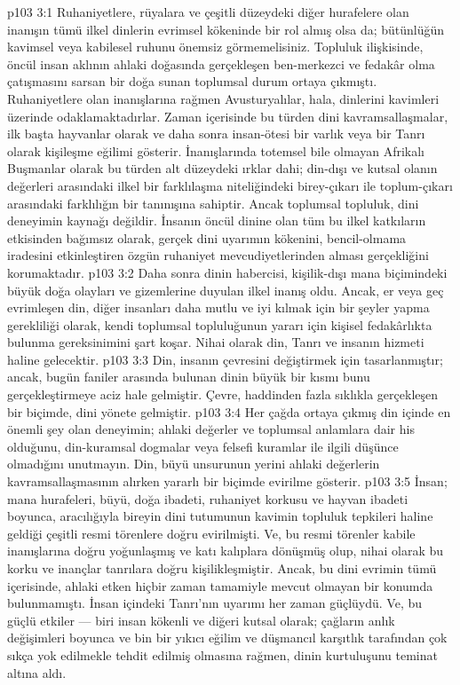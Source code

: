 \vs p103 3:1 Ruhaniyetlere, rüyalara ve çeşitli düzeydeki diğer hurafelere olan inanışın tümü ilkel dinlerin evrimsel kökeninde bir rol almış olsa da; bütünlüğün kavimsel veya kabilesel ruhunu önemsiz görmemelisiniz. Topluluk ilişkisinde, öncül insan aklının ahlaki doğasında gerçekleşen ben\hyp{}merkezci ve fedakâr olma çatışmasını sarsan bir doğa sunan toplumsal durum ortaya çıkmıştı. Ruhaniyetlere olan inanışlarına rağmen Avusturyalılar, hala, dinlerini kavimleri üzerinde odaklamaktadırlar. Zaman içerisinde bu türden dini kavramsallaşmalar, ilk başta hayvanlar olarak ve daha sonra insan\hyp{}ötesi bir varlık veya bir Tanrı olarak kişileşme eğilimi gösterir. İnanışlarında totemsel bile olmayan Afrikalı Buşmanlar olarak bu türden alt düzeydeki ırklar dahi; din\hyp{}dışı ve kutsal olanın değerleri arasındaki ilkel bir farklılaşma niteliğindeki birey\hyp{}çıkarı ile toplum\hyp{}çıkarı arasındaki farklılığın bir tanınışına sahiptir. Ancak toplumsal topluluk, dini deneyimin kaynağı değildir. İnsanın öncül dinine olan tüm bu ilkel katkıların etkisinden bağımsız olarak, gerçek dini uyarımın kökenini, bencil\hyp{}olmama iradesini etkinleştiren özgün ruhaniyet mevcudiyetlerinden alması gerçekliğini korumaktadır.
\vs p103 3:2 Daha sonra dinin habercisi, kişilik\hyp{}dışı mana biçimindeki büyük doğa olayları ve gizemlerine duyulan ilkel inanış oldu. Ancak, er veya geç evrimleşen din, diğer insanları daha mutlu ve iyi kılmak için bir şeyler yapma gerekliliği olarak, kendi toplumsal topluluğunun yararı için kişisel fedakârlıkta bulunma gereksinimini şart koşar. Nihai olarak din, Tanrı ve insanın hizmeti haline gelecektir.
\vs p103 3:3 Din, insanın çevresini değiştirmek için tasarlanmıştır; ancak, bugün faniler arasında bulunan dinin büyük bir kısmı bunu gerçekleştirmeye aciz hale gelmiştir. Çevre, haddinden fazla sıklıkla gerçekleşen bir biçimde, dini yönete gelmiştir.
\vs p103 3:4 Her çağda ortaya çıkmış din içinde en önemli şey olan deneyimin; ahlaki değerler ve toplumsal anlamlara dair his olduğunu, din\hyp{}kuramsal dogmalar veya felsefi kuramlar ile ilgili düşünce olmadığını unutmayın. Din, büyü unsurunun yerini ahlaki değerlerin kavramsallaşmasının alırken yararlı bir biçimde evirilme gösterir.
\vs p103 3:5 İnsan; mana hurafeleri, büyü, doğa ibadeti, ruhaniyet korkusu ve hayvan ibadeti boyunca, aracılığıyla bireyin dini tutumunun kavimin topluluk tepkileri haline geldiği çeşitli resmi törenlere doğru evirilmişti. Ve, bu resmi törenler kabile inanışlarına doğru yoğunlaşmış ve katı kalıplara dönüşmüş olup, nihai olarak bu korku ve inançlar tanrılara doğru kişilikleşmiştir. Ancak, bu dini evrimin tümü içerisinde, ahlaki etken hiçbir zaman tamamiyle mevcut olmayan bir konumda bulunmamıştı. İnsan içindeki Tanrı’nın uyarımı her zaman güçlüydü. Ve, bu güçlü etkiler --- biri insan kökenli ve diğeri kutsal olarak; çağların anlık değişimleri boyunca ve bin bir yıkıcı eğilim ve düşmancıl karşıtlık tarafından çok sıkça yok edilmekle tehdit edilmiş olmasına rağmen, dinin kurtuluşunu teminat altına aldı.
